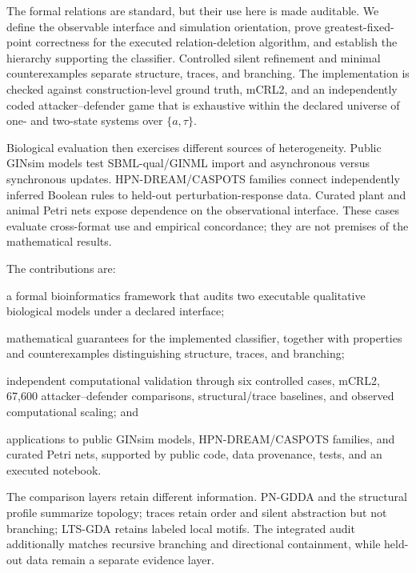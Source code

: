 \documentclass{ws-jbcb}
\numberwithin{equation}{section}
\newcommand{\TAU}{\tau}
\begin{document}
The formal relations are standard, but their use here is made auditable. We
define the observable interface and simulation orientation, prove
greatest-fixed-point correctness for the executed relation-deletion algorithm,
and establish the hierarchy supporting the classifier. Controlled silent
refinement and minimal counterexamples separate structure, traces, and branching.
The implementation is checked against construction-level ground truth, mCRL2,
and an independently coded attacker--defender game that is exhaustive within the
declared universe of one- and two-state systems over $\{a,\TAU\}$.

Biological evaluation then exercises different sources of heterogeneity. Public
GINsim models test SBML-qual/GINML import and asynchronous versus synchronous
updates.\cite{Naldi2018,Chaouiya2013SBML,Traynard2016,AbouJaoude2009}
HPN-DREAM/CASPOTS families connect independently inferred Boolean rules to
held-out perturbation-response data.\cite{Hill2016,Razzaq2018} Curated plant and
animal Petri nets expose dependence on the observational interface. These cases
evaluate cross-format use and empirical concordance; they are not premises of
the mathematical results.

The contributions are:
\begin{romanlist}[(iv)]
\item a formal bioinformatics framework that audits two executable qualitative
biological models under a declared interface;
\item mathematical guarantees for the implemented classifier, together with
properties and counterexamples distinguishing structure, traces, and branching;
\item independent computational validation through six controlled cases,
mCRL2, 67,600 attacker--defender comparisons, structural/trace baselines, and
observed computational scaling; and
\item applications to public GINsim models, HPN-DREAM/CASPOTS families, and
curated Petri nets, supported by public code, data provenance, tests, and an
executed notebook.
\end{romanlist}

The comparison layers retain different information. PN-GDDA and the structural
profile summarize topology; traces retain order and silent abstraction but not
branching; LTS-GDA retains labeled local motifs. The integrated audit additionally
matches recursive branching and directional containment, while held-out data
remain a separate evidence layer.
\end{document}
